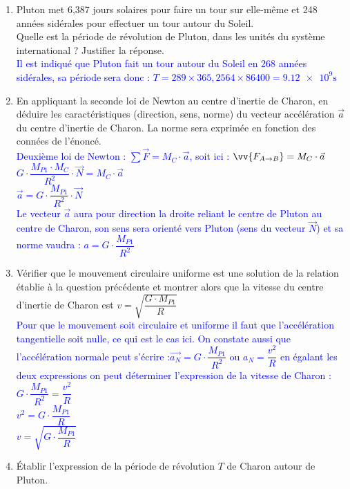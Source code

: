 \documentclass[a4paper,12pt]{article}
\begin{document}
\begin{enumerate}
	\item Pluton met 6,387 jours solaires pour faire un tour sur elle-même et 248 années sidérales pour effectuer un tour autour du Soleil.\\
	Quelle est la période de révolution de Pluton, dans les unités du système international ? Justifier la réponse.\\
	\textcolor{blue}{Il est indiqué que Pluton fait un tour autour du Soleil en 268 années sidérales, sa période sera donc : $T=289\times 365,2564 \times 86400 = \num{9,12e9} \unit{\second}$}
	\item En appliquant la seconde loi de Newton au centre d'inertie de Charon, en déduire les caractéristiques (direction, sens, norme) du vecteur accélération $\vec{a}$ du centre d'inertie de Charon. La norme sera exprimée en fonction des connées de l'énoncé.\\
	\textcolor{blue}{Deuxième loi de Newton : $\sum \vec{F} = M_{C} \cdot \vec{a}$, soit ici : $\vv{F_{A\rightarrow B}} =M_{C} \cdot \vec{a}$\\
	$G \cdot \dfrac{M_{P1} \cdot M_C}{R^2} \cdot \vec{N}=M_{C} \cdot \vec{a}$\\
	$\vec{a} =G \cdot \dfrac{M_{P1}}{R^2} \cdot \vec{N}$\\
	Le vecteur $\vec{a}$ aura pour direction la droite reliant le centre de Pluton au centre de Charon, son sens sera orienté vers Pluton (sens du vecteur $\vec{N}$) et sa norme vaudra : $a = G \cdot \dfrac{M_{P1}}{R^2}$}
	\item Vérifier que le mouvement circulaire uniforme est une solution de la relation établie à la question précédente et montrer alors que la vitesse du centre d'inertie de Charon est $v = \sqrt{\dfrac{G \cdot M_{P1}}{R}}$\\
	\textcolor{blue}{Pour que le mouvement soit circulaire et uniforme il faut que l'accélération tangentielle soit nulle, ce qui est le cas ici. On constate aussi que l'accélération normale peut s'écrire :$\vec{a_N} =G \cdot \dfrac{M_{P1}}{R^2}$  ou $a_N = \dfrac{v^2}{R}$ en égalant les deux expressions on peut déterminer l'expression de la vitesse de Charon : \\
	$G \cdot \dfrac{M_{P1}}{R^2} = \dfrac{v^2}{R}$\\
	$v^2 = G \cdot \dfrac{M_{P1}}{R}$\\
	$v = \sqrt{G \cdot \dfrac{M_{P1}}{R}}$}
	\item Établir l'expression de la période de révolution $T$ de Charon autour de Pluton.\\

\end{enumerate}
\end{document}
